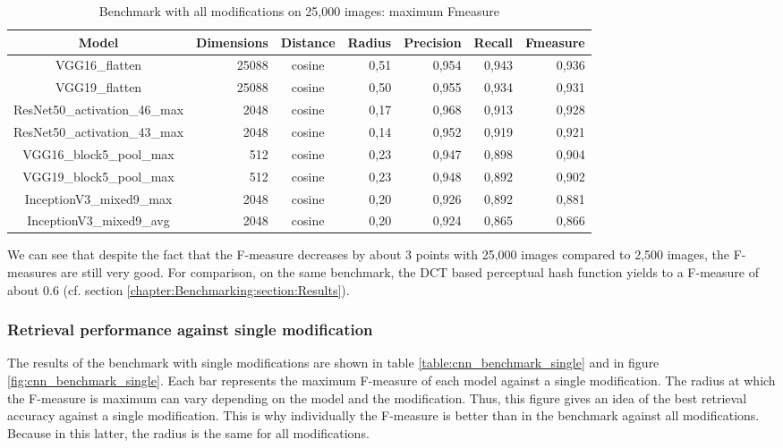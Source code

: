 \begin{table}
	\centering
	\caption{Benchmark with all modifications on 25,000 images: maximum Fmeasure}
	\label{table:benchmark_all}
	\begin{tabular}{|crcrrrr|}
	\hline
	Model                         & Dimensions & Distance & Radius & Precision & Recall & Fmeasure \\
	\hline
	VGG16\_flatten                &      25088 & cosine   &   0,51 &     0,954 &  0,943 &    0,936 \\
	VGG19\_flatten                &      25088 & cosine   &   0,50 &     0,955 &  0,934 &    0,931 \\
	ResNet50\_activation\_46\_max &       2048 & cosine   &   0,17 &     0,968 &  0,913 &    0,928 \\
	ResNet50\_activation\_43\_max &       2048 & cosine   &   0,14 &     0,952 &  0,919 &    0,921 \\
	VGG16\_block5\_pool\_max      &        512 & cosine   &   0,23 &     0,947 &  0,898 &    0,904 \\
	VGG19\_block5\_pool\_max      &        512 & cosine   &   0,23 &     0,948 &  0,892 &    0,902 \\
	InceptionV3\_mixed9\_max      &       2048 & cosine   &   0,20 &     0,926 &  0,892 &    0,881 \\
	InceptionV3\_mixed9\_avg      &       2048 & cosine   &   0,20 &     0,924 &  0,865 &    0,866 \\
	\hline
	\end{tabular}
\end{table}

We can see that despite the fact that the F-measure decreases by about 3 points with 25,000 images compared to 2,500 images, the F-measures are still very good. For comparison, on the same benchmark, the DCT based perceptual hash function yields to a F-measure of about 0.6 (cf. section \ref{chapter:Benchmarking:section:Results}).

\subsubsection{Retrieval performance against single modification}
The results of the benchmark with single modifications are shown in table \ref{table:cnn_benchmark_single} and in figure \ref{fig:cnn_benchmark_single}. Each bar represents the maximum F-measure of each model against a single modification. The radius at which the F-measure is maximum can vary depending on the model and the modification. Thus, this figure gives an idea of the best retrieval accuracy against a single modification. This is why individually the F-measure is better than in the benchmark against all modifications. Because in this latter, the radius is the same for all modifications.


